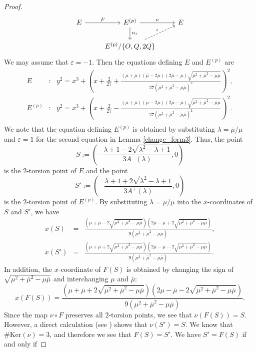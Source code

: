 \documentclass[a4paper, 11pt]{article}
\theoremstyle{plain}
\newcommand{\?}{\textcolor{red}{??}}
\newcommand{\lm}{\lambda}
\begin{document}
\begin{proof}
   \[
\begin{tikzcd}
 E\arrow[r, "F "] & E^{(p)} \arrow[r, "\nu"] \arrow[d,"{\nu}_{0}"] & E \\
& E^{(p)} / \{O,Q,2Q\} \arrow[ur, "\iota", dashed]
\end{tikzcd}
\] 
We may assume that $\varepsilon=-1$. Then  the equations defining $E$ and $E^{(p)}$ are
\begin{eqnarray*}
    E&:&y^2=x^3+\left(x+\frac{2}{27}+\frac{(\mu+\overline{\mu})(\overline{\mu}-2\mu)(2\overline{\mu}-\mu)\sqrt{{\mu }^2+{\overline{\mu} }^2-\mu\overline{\mu}}}{27({\mu }^2+{\overline{\mu} }^2-\mu\overline{\mu})^2} \right)^2,\\
    E^{(p)}&:&y^2=x^3+\left(x+\frac{2}{27}-\frac{(\mu+\overline{\mu})(\overline{\mu}-2\mu)(2\overline{\mu}-\mu)\sqrt{{\mu }^2+{\overline{\mu} }^2-\mu\overline{\mu}}}{27({\mu }^2+{\overline{\mu} }^2-\mu\overline{\mu})^2} \right)^2.\\
\end{eqnarray*}
We note that the equation defining $E^{(p)}$ is obtained by substituting $\lm=\overline{\mu}/\mu$ and $\varepsilon=1$ for the second equation in Lemma \ref{change_form3}. Thus, the point
\[
S:=\left(-\frac{\lm+1-2\sqrt{\lm^2-\lm+1}}{3A^{-}(\lm)},0\right)
\]
is the $2$-torsion point of $E$ and the point \[
S':=\left(-\frac{\lm+1+2\sqrt{\lm^2-\lm+1}}{3A^{+}(\lm)},0\right)
\]
is the $2$-torsion point of $E^{(p)}$.
By substituting $\lm=\overline{\mu}/\mu$ into the $x$-coordinates of $S$ and $S'$, we have
\begin{eqnarray*}
    x(S)&=&\frac{\left(\mu+\overline{\mu}-2\sqrt{\mu^2+\overline{\mu}^2-\mu\overline{\mu}}\right)\left(2\overline{\mu}-\mu+2\sqrt{\mu^2+\overline{\mu}^2-\mu\overline{\mu}}\right)}{9(\mu^2+\overline{\mu}^2-\mu\overline{\mu})},\\
    x(S') &=&\frac{\left(\mu+\overline{\mu}+2\sqrt{\mu^2+\overline{\mu}^2-\mu\overline{\mu}}\right)\left(2\overline{\mu}-\mu-2\sqrt{\mu^2+\overline{\mu}^2-\mu\overline{\mu}}\right)}{9(\mu^2+\overline{\mu}^2-\mu\overline{\mu})}.
\end{eqnarray*}
In addition, the $x$-coordinate of $F(S)$ is obtained by changing the sign of $\sqrt{\mu^2+\overline{\mu}^2-\mu\overline{\mu}}$ and interchanging $\mu$ and $\overline{\mu}$:
\[
x(F(S))=\frac{\left(\mu+\overline{\mu}+2\sqrt{\mu^2+\overline{\mu}^2-\mu\overline{\mu}}\right)\left(2\mu-\overline{\mu}-2\sqrt{\mu^2+\overline{\mu}^2-\mu\overline{\mu}}\right)}{9(\mu^2+\overline{\mu}^2-\mu\overline{\mu})}.
\]
Since the map $\nu \circ F$ preserves all $2$-torsion points, we see that $\nu (F(S))=S$. However, a direct calculation (see \cite[6-1,6-2]{Github}) shows that $\nu(S')=S$. We know that $\#\text{Ker}(\nu)=3$, and therefore we see that $F(S)=S'$. We have $S'=F(S)$ if and only if 

\end{proof}
\end{document}

